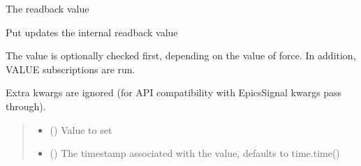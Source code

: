 \documentclass[letterpaper,10pt,english]{sphinxmanual}
\begin{document}
\begin{fulllineitems}
\label{\detokenize{API:raypyng_bluesky.signal.RayPySignal}}
\pysigstartsignatures
{}
\pysigstopsignatures{}

\begin{fulllineitems}
\label{\detokenize{API:raypyng_bluesky.signal.RayPySignal.get}}
\pysigstartsignatures
{}
\pysigstopsignatures
\sphinxAtStartPar
The readback value

\end{fulllineitems}


\begin{fulllineitems}
\label{\detokenize{API:raypyng_bluesky.signal.RayPySignal.put}}
\pysigstartsignatures
{}
\pysigstopsignatures
\sphinxAtStartPar
Put updates the internal readback value

\sphinxAtStartPar
The value is optionally checked first, depending on the value of force.
In addition, VALUE subscriptions are run.

\sphinxAtStartPar
Extra kwargs are ignored (for API compatibility with EpicsSignal kwargs
pass through).
\begin{quote}\begin{description}
\begin{itemize}
\item {} 
\sphinxAtStartPar
{} () \textendash{} Value to set

\item {} 
\sphinxAtStartPar
{} (\sphinxstyleliteralemphasis{\sphinxupquote{, }}) \textendash{} The timestamp associated with the value, defaults to time.time()


\end{itemize}
\end{description}
\end{quote}
\end{fulllineitems}
\end{fulllineitems}
\end{document}

